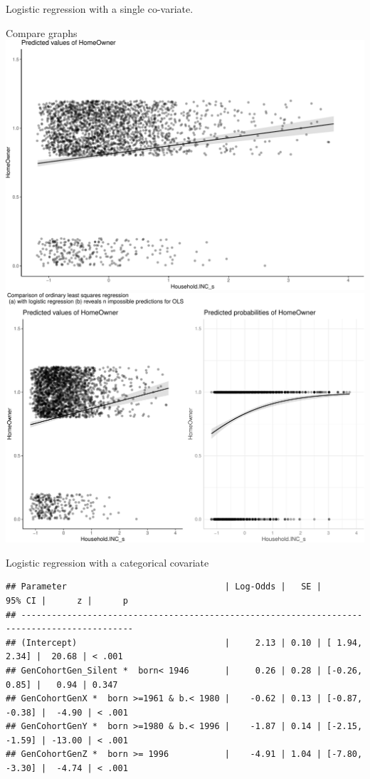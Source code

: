 \documentclass[
  ignorenonframetext,
]{beamer}
\begin{document}
\begin{frame}[fragile]{Logistic regression with a single co-variate.}
\begin{block}{Compare graphs}
\protect\hypertarget{compare-graphs}{}
\includegraphics{slides_files/figure-beamer/unnamed-chunk-20-1.pdf}
\includegraphics{slides_files/figure-beamer/unnamed-chunk-20-2.pdf}
\end{block}

\begin{block}{Logistic regression with a categorical covariate}
\protect\hypertarget{logistic-regression-with-a-categorical-covariate}{}
\begin{verbatim}
## Parameter                               | Log-Odds |   SE |         95% CI |      z |      p
## --------------------------------------------------------------------------------------------
## (Intercept)                             |     2.13 | 0.10 | [ 1.94,  2.34] |  20.68 | < .001
## GenCohortGen_Silent *  born< 1946       |     0.26 | 0.28 | [-0.26,  0.85] |   0.94 | 0.347 
## GenCohortGenX *  born >=1961 & b.< 1980 |    -0.62 | 0.13 | [-0.87, -0.38] |  -4.90 | < .001
## GenCohortGenY *  born >=1980 & b.< 1996 |    -1.87 | 0.14 | [-2.15, -1.59] | -13.00 | < .001
## GenCohortGenZ *  born >= 1996           |    -4.91 | 1.04 | [-7.80, -3.30] |  -4.74 | < .001
\end{verbatim}
\end{block}


\end{frame}
\end{document}
